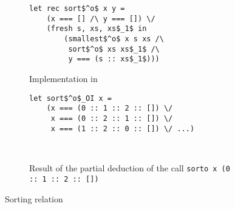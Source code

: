 \begin{figure}[!t]
  \centering
  \begin{subfigure}[b]{0.45\textwidth}
    \begin{lstlisting}[frame=tb, mathescape=true]
let rec sort$^o$ x y =
    (x === [] /\ y === []) \/
    (fresh s, xs, xs$_1$ in
        (smallest$^o$ x s xs /\
         sort$^o$ xs xs$_1$ /\
         y === (s :: xs$_1$)))
    \end{lstlisting}
   \caption{Implementation in \mk}
    \label{fig:sortIn}
  \end{subfigure}
  \hfill
  \begin{subfigure}[b]{0.45\textwidth}
    \begin{lstlisting}[frame=tb, mathescape=true]
let sort$^o$_OI x =
    (x === (0 :: 1 :: 2 :: []) \/
     x === (0 :: 2 :: 1 :: []) \/
     x === (1 :: 2 :: 0 :: []) \/ ...) 
   
   
    \end{lstlisting}
    \caption{Result of the partial deduction of the call \lstinline{sorto x (0 :: 1 :: 2 :: [])}}
    \label{fig:sortDeduced}
  \end{subfigure}


  \caption{Sorting relation}
  \label{fig:sort}
\end{figure}